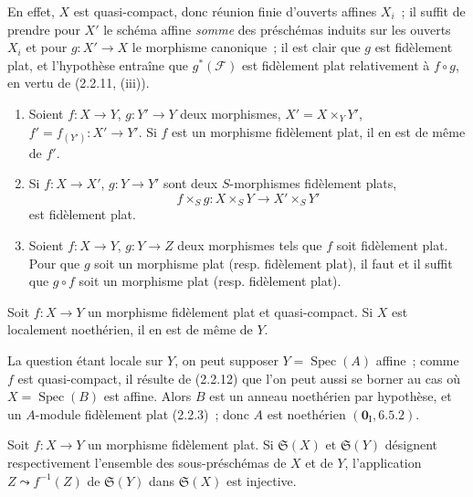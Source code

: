En effet, $X$ est quasi-compact, donc réunion finie d'ouverts affines $X_i$~;
il suffit de prendre pour $X'$ le schéma affine \emph{somme} des préschémas
induits sur les ouverts $X_i$ et
pour $g:X'\to X$ le morphisme canonique~; il est clair que $g$ est fidèlement
plat, et
l'hypothèse entraîne que $g^*(\mathscr F)$ est fidèlement plat
relativement à $f\circ g$, en vertu de (2.2.11, (iii)).

\begin{corollary}[2.2.13]
\label{IV.2.2.13-fr}
\begin{enumerate}
\item[\textup{(i)}] Soient $f:X\to Y$, $g:Y'\to Y$ deux morphismes,
$X'=X\times_Y Y'$, $f'=f_{(Y')}:X'\to Y'$. Si $f$ est un morphisme
fidèlement plat, il en est de même de $f'$.
\item[\textup{(ii)}] Si $f:X\to X'$, $g:Y\to Y'$ sont deux $S$-morphismes fidèlement
plats,
\[
f\times_S g:X\times_S Y\longrightarrow X'\times_S Y'
\]
est fidèlement plat.
\item[\textup{(iii)}] Soient $f:X\to Y$, $g:Y\to Z$ deux morphismes tels que $f$ soit
fidèlement plat. Pour que $g$ soit un morphisme plat \textup{(resp.} fidèlement plat),
il faut et il suffit que $g\circ f$ soit un morphisme plat \textup{(resp.} fidèlement
plat).
\end{enumerate}
\end{corollary}

\begin{proposition}[2.2.14]
\label{IV.2.2.14-fr}
Soit $f:X\to Y$ un morphisme fidèlement plat et quasi-compact. Si $X$ est
localement noethérien, il en est de même de $Y$.
\end{proposition}

La question étant locale sur $Y$, on peut supposer $Y=\operatorname{Spec}(A)$
affine~; comme $f$ est quasi-compact, il résulte de (2.2.12) que l'on peut
aussi se borner au cas où $X=\operatorname{Spec}(B)$ est affine. Alors $B$
est un anneau noethérien par hypothèse, et un $A$-module fidèlement plat
(2.2.3)~; donc $A$ est noethérien $(\mathbf{0}_{\mathrm I},6.5.2)$.

\begin{proposition}[2.2.15]
\label{IV.2.2.15-fr}
Soit $f:X\to Y$ un morphisme fidèlement plat. Si $\mathfrak S(X)$ et
$\mathfrak S(Y)$ désignent respectivement l'ensemble des sous-préschémas de
$X$ et de $Y$, l'application $Z\leadsto f^{-1}(Z)$ de $\mathfrak S(Y)$ dans
$\mathfrak S(X)$ est injective.
\end{proposition}


